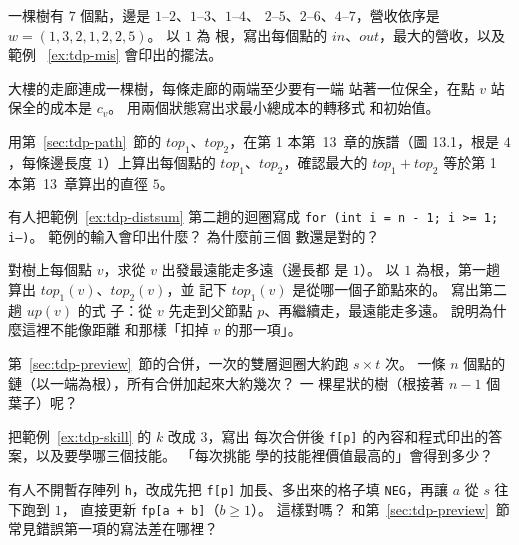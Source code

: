 \begin{drills}[label=drills:ch10]
\item \label{drill:tdp-trace} 一棵樹有 $7$ 個點，邊是 $1$--$2$、$1$--$3$、$1$--$4$、
$2$--$5$、$2$--$6$、$4$--$7$，營收依序是 $w = (1, 3, 2, 1, 2, 2, 5)$。 以 $1$ 為
根，寫出每個點的 $\mathit{in}$、$\mathit{out}$，最大的營收，以及範例
~\ref{ex:tdp-mis} 會印出的擺法。

\item \label{drill:tdp-cover} 大樓的走廊連成一棵樹，每條走廊的兩端至少要有一端
站著一位保全，在點 $v$ 站保全的成本是 $c_v$。 用兩個狀態寫出求最小總成本的轉移式
和初始值。

\item 用第~\ref{sec:tdp-path}~節的 $\mathit{top}_1$、$\mathit{top}_2$，在第 1 本第~13~章的族譜（圖 13.1，根是 $4$，每條邊長度 $1$）上算出每個點的
$\mathit{top}_1$、$\mathit{top}_2$，確認最大的 $\mathit{top}_1 +
\mathit{top}_2$ 等於第 1 本第~13~章算出的直徑 $5$。

\item 有人把範例~\ref{ex:tdp-distsum} 第二趟的迴圈寫成
\texttt{for (int i = n - 1; i >= 1; i--)}。 範例的輸入會印出什麼？ 為什麼前三個
數還是對的？

\item \label{drill:tdp-ecc} 對樹上每個點 $v$，求從 $v$ 出發最遠能走多遠（邊長都
是 $1$）。 以 $1$ 為根，第一趟算出 $\mathit{top}_1(v)$、$\mathit{top}_2(v)$，並
記下 $\mathit{top}_1(v)$ 是從哪一個子節點來的。 寫出第二趟 $\mathit{up}(v)$ 的式
子：從 $v$ 先走到父節點 $p$、再繼續走，最遠能走多遠。 說明為什麼這裡不能像距離
和那樣「扣掉 $v$ 的那一項」。

\item 第~\ref{sec:tdp-preview}~節的合併，一次的雙層迴圈大約跑 $s \times
t$ 次。 一條 $n$ 個點的鏈（以一端為根），所有合併加起來大約幾次？ 一
棵星狀的樹（根接著 $n - 1$ 個葉子）呢？

\item \label{drill:tdp-knap-k3} 把範例~\ref{ex:tdp-skill} 的 $k$ 改成 $3$，寫出
每次合併後 \texttt{f[p]} 的內容和程式印出的答案，以及要學哪三個技能。 「每次挑能
學的技能裡價值最高的」會得到多少？

\item \label{drill:tdp-knap-inplace} 有人不開暫存陣列 \texttt{h}，改成先把
\texttt{f[p]} 加長、多出來的格子填 \texttt{NEG}，再讓 $a$ 從 $s$ 往下跑到 $1$，
直接更新 \texttt{fp[a + b]}（$b \ge 1$）。 這樣對嗎？ 和第~\ref{sec:tdp-preview}~節
常見錯誤第一項的寫法差在哪裡？
\end{drills}

